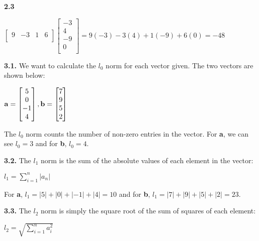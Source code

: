 \documentclass[12pt]{article}
\begin{document}
{\bf 2.3} 

\begin{center}
$
\begin{bmatrix}
9 & -3 & 1 & 6\\
\end{bmatrix}
\begin{bmatrix}
-3\\
4\\
-9\\
0\\
\end{bmatrix}=
9(-3)-3(4)+1(-9)+6(0)=-48
$
\end{center}

{\bf 3.1.} We want to calculate the $l_{0}$ norm for each vector given. The two vectors are shown below:

\begin{center}
$
{\bf a}=
\begin{bmatrix}
5\\
0\\
-1\\
4\\
\end{bmatrix}, {\bf b}=
\begin{bmatrix}

7\\
9\\
5\\
2\\
\end{bmatrix}
$\\
\end{center}

The $l_{0}$ norm counts the number of non-zero entries in the vector. For {\bf a}, we can see $l_{0}=3$ and for {\bf b}, $l_{0}=4$. 

{\bf 3.2.} The $l_{1}$ norm is the sum of the absolute values of each element in the vector:

\begin{center}

$l_{1}=\sum_{i=1}^{n}|a_{n}|$\\

\end{center}

For {\bf a}, $l_{1}=|5|+|0|+|-1|+|4|=10$ and for {\bf b}, $l_{1}=|7|+|9|+|5|+|2|=23$.

{\bf 3.3.} The $l_{2}$ norm is simply the square root of the sum of squares of each element:

\begin{center}

$l_{2}=\sqrt{\sum_{i=1}^{n}a_{i}^{2}}$\\

\end{center}
\end{document}
